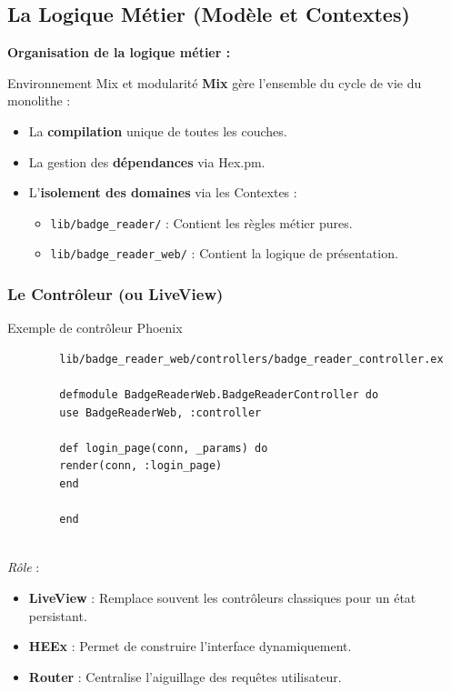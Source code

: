 \subsection{La Logique Métier (Modèle et Contextes)}

\textbf{Organisation de la logique métier :\newline} 
\begin{for_you}{Environnement Mix et modularité}
    \textbf{Mix} gère l'ensemble du cycle de vie du monolithe :
    \begin{itemize}
        \item La \textbf{compilation} unique de toutes les couches.
        \item La gestion des \textbf{dépendances} via Hex.pm.
        \item L'\textbf{isolement des domaines} via les Contextes :
              \begin{itemize}
                  \item \texttt{lib/badge\_reader/} : Contient les règles métier pures.
                  \item \texttt{lib/badge\_reader\_web/} : Contient la logique de présentation.
              \end{itemize}
    \end{itemize}
\end{for_you}

\subsubsection{Le Contrôleur (ou LiveView)}

\begin{for_you}{Exemple de contrôleur Phoenix}
    \begin{lstlisting}
        lib/badge_reader_web/controllers/badge_reader_controller.ex
        
        defmodule BadgeReaderWeb.BadgeReaderController do
        use BadgeReaderWeb, :controller
        
        def login_page(conn, _params) do
        render(conn, :login_page)
        end
        
        end
        
    \end{lstlisting}
    
    \textit{Rôle} :
    \begin{itemize}
        \item \textbf{LiveView} : Remplace souvent les contrôleurs classiques pour un état persistant.
        \item \textbf{HEEx} : Permet de construire l'interface dynamiquement.
        \item \textbf{Router} : Centralise l'aiguillage des requêtes utilisateur.
    \end{itemize}
\end{for_you}

